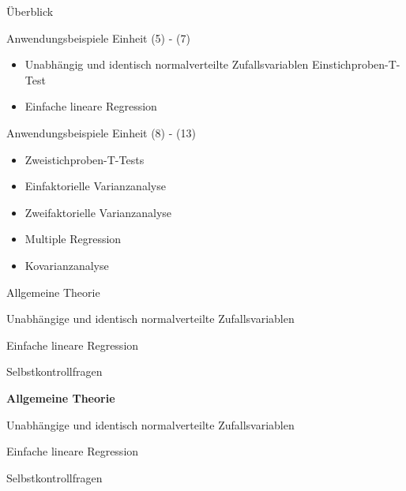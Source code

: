 \documentclass[
  8pt,
  ignorenonframetext,
]{beamer}
\providecommand{\tightlist}{%
  \setlength{\itemsep}{0pt}\setlength{\parskip}{0pt}}
\begin{document}
\begin{frame}{Überblick}
\protect\hypertarget{uxfcberblick-6}{}

Anwendungsbeispiele Einheit (5) - (7)

\begin{itemize}
\tightlist
\item
  Unabhängig und identisch normalverteilte Zufallsvariablen \textbar{}
  Einstichproben-T-Test
\item
  Einfache lineare Regression
\end{itemize}

Anwendungsbeispiele Einheit (8) - (13)

\begin{itemize}
\tightlist
\item
  Zweistichproben-T-Tests
\item
  Einfaktorielle Varianzanalyse
\item
  Zweifaktorielle Varianzanalyse
\item
  Multiple Regression
\item
  Kovarianzanalyse
\end{itemize}
\end{frame}

\begin{frame}{}
\protect\hypertarget{section-2}{}
\large
{}
\vfill

Allgemeine Theorie

Unabhängige und identisch normalverteilte Zufallsvariablen

Einfache lineare Regression

Selbstkontrollfragen \vfill
\end{frame}

\begin{frame}{}
\protect\hypertarget{section-3}{}
\large
{}
\vfill

\textbf{Allgemeine Theorie}

Unabhängige und identisch normalverteilte Zufallsvariablen

Einfache lineare Regression

Selbstkontrollfragen \vfill
\end{frame}
\end{document}
